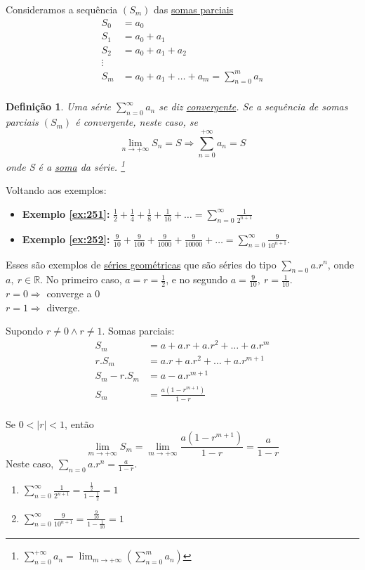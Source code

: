 \documentclass[12pt,openany, letterpaper]{book}
\newtheorem{definition}{Definição}[section]
\begin{document}
Consideramos a sequência $(S_m)$ das \underline{somas parciais}
\begin{align*}
S_0 &= a_0 \\
S_1 &= a_0 + a_1 \\
S_2 &= a_0 + a_1 + a_2 \\
\vdots \\
S_m &= a_0 + a_1 + \hdots + a_m = \sum_{n=0}^m a_n \\
\end{align*}


\begin{definition}
Uma série $\sum_{n=0}^{\infty} a_n$ se diz \underline{convergente}. Se a sequência de somas parciais $(S_m)$ é convergente, neste caso, se $$ \lim_{n \rightarrow +\infty} S_n = S \Rightarrow \sum_{n=0}^{+\infty} a_n = S $$ onde S é a \underline{soma} da série. \footnote{$\displaystyle{\sum_{n=0}^{+\infty} a_n = \lim_{m \rightarrow +\infty} \left(\sum_{n=0}^m a_n\right)}$ }
\end{definition}


Voltando aos exemplos:
\begin{itemize}
\item \textbf{Exemplo \ref{ex:251}: } $\displaystyle{\frac{1}{2} + \frac{1}{4} + \frac{1}{8} + \frac{1}{16} + \hdots = \sum_{n=0}^{\infty} \frac{1}{2^{n+1}}}$
\item \textbf{Exemplo \ref{ex:252}: } $\displaystyle{\frac{9}{10} + \frac{9}{100} + \frac{9}{1000} + \frac{9}{10000} + \hdots = \sum_{n=0}^{\infty} \frac{9}{10^{n+1}}}$.
\end{itemize}
Esses são exemplos de \underline{séries geométricas} que são séries do tipo $\displaystyle{\sum_{n=0} a.r^n}$, onde $a, \ r \in \mathds{R}$. No primeiro caso, $a=r=\frac{1}{2}$, e no segundo $a = \frac{9}{10}, \ r = \frac{1}{10}$. \\ $r = 0 \Rightarrow $ converge a 0 \\ $r = 1 \Rightarrow $ diverge.

Supondo $r \neq 0 \land r \neq 1$. Somas parciais:
\begin{align*}
S_m &= a + a.r + a.r^2 + \hdots + a.r^m \\
r.S_m &= a.r + a.r^2 + \hdots + a.r^{m+1} \\
S_m - r.S_m &= a - a.r^{m+1} \\
S_m &= \frac{a(1-r^{m+1})}{1-r} \\
\end{align*}

Se $0 < |r| < 1$, então $$\lim_{m \rightarrow +\infty} S_m = \lim_{m \rightarrow +\infty} \frac{a(1-r^{m+1})}{1-r} = \frac{a}{1-r}$$ Neste caso, $\displaystyle{\sum_{n=0} a.r^n = \frac{a}{1-r}}$.
\begin{enumerate}
\item $\sum_{n=0}^{\infty} \frac{1}{2^{n+1}} = \frac{\frac{1}{2}}{1-\frac{1}{2}} = 1$
\item $\sum_{n=0}^{\infty} \frac{9}{10^{n+1}} = \frac{\frac{9}{10}}{1-\frac{1}{10}} = 1 $
\end{enumerate}
\end{document}
